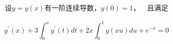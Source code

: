 \clearpage


\vspace*{-30pt}

\begin{gather*}
	\text{设$y=y(x)$有一阶连续导数，} y\left(0\right)=1，\hspace{1em} 且满足
\end{gather*}

\vspace*{-30pt}

\begin{equation}\label{jieweifenfangcheng-2}
	y^{\prime}\left(x\right)+3\int_{0}^{x}y^{\prime}\left(t\right)dt+2x\int_{0}^{1}y\left(xu\right)du+e^{-x}=0
\end{equation}

\vspace*{-30pt}

